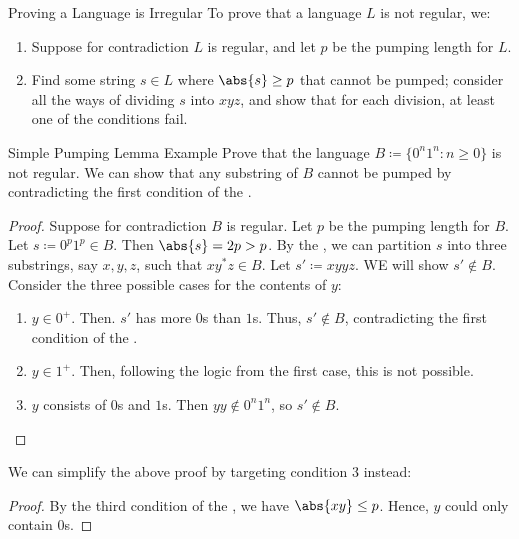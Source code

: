\begin{tecbox}{Proving a Language is Irregular}{}
    To prove that a language $L$ is not regular, we:
    \begin{enumerate}
        \item Suppose for contradiction $L$ is regular, and let $p$ be the pumping length for $L$.
        \item Find some string $s \in L$ where $\abs{s} \geq p$ that cannot be pumped; consider all the ways of dividing $s$ into $xyz$, and show that for each division, at least one of the conditions fail.
    \end{enumerate}
\end{tecbox}

\begin{exbox}{Simple Pumping Lemma Example}{}
    Prove that the language $B \coloneq \{ 0^n 1^n : n \geq 0 \}$ is not regular.
    \tcblower
    We can show that any substring of $B$ cannot be pumped by contradicting the first condition of the .
    \begin{proof}
        Suppose for contradiction $B$ is regular. Let $p$ be the pumping length for $B$. Let $s \coloneq 0^p1^p \in B$. Then $\abs{s} = 2p > p$. By the , we can partition $s$ into three substrings, say $x,y,z$, such that $x  y^*  z \in B$. Let $s\prime \coloneq x  y  y  z$. WE will show $s\prime \notin B$. Consider the three possible cases for the contents of $y$:
        \begin{enumerate}
            \item $y \in 0^+$. Then. $s\prime$ has more $0$s than $1$s. Thus, $s\prime \notin B$, contradicting the first condition of the .
            \item $y \in 1^+$. Then, following the logic from the first case, this is not possible.
            \item $y$ consists of $0$s and $1$s. Then $y  y \notin 0^n1^n$, so $s \prime \notin B$.
        \end{enumerate}
    \end{proof}

    We can simplify the above proof by targeting condition 3 instead:
    \begin{proof}
        By the third condition of the , we have $\abs{x  y} \leq p$. Hence, $y$ could only contain $0$s.
    \end{proof}
\end{exbox}

